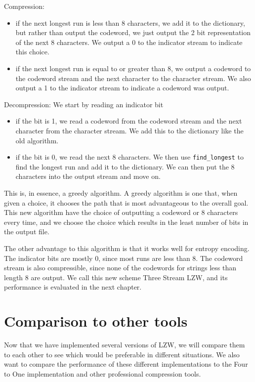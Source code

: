 \documentclass[12pt,twoside]{reedthesis}
\providecommand{\tightlist}{%
  \setlength{\itemsep}{0pt}\setlength{\parskip}{0pt}}
\begin{document}
Compression:
\begin{itemize}
\tightlist
\item
  if the next longest run is less than 8 characters, we add it to the dictionary, but rather than output the codeword, we just output the 2 bit representation of the next 8 characters. We output a 0 to the indicator stream to indicate this choice.
\item
  if the next longest run is equal to or greater than 8, we output a codeword to the codeword stream and the next character to the character stream. We also output a 1 to the indicator stream to indicate a codeword was output.
\end{itemize}
Decompression: We start by reading an indicator bit
\begin{itemize}
\tightlist
\item
  if the bit is 1, we read a codeword from the codeword stream and the next character from the character stream. We add this to the dictionary like the old algorithm.
\item
  if the bit is 0, we read the next 8 characters. We then use \texttt{find\_longest} to find the longest run and add it to the dictionary. We can then put the 8 characters into the output stream and move on.
\end{itemize}
This is, in essence, a greedy algorithm. A greedy algorithm is one that, when given a choice, it chooses the path that is most advantageous to the overall goal. This new algorithm have the choice of outputting a codeword or 8 characters every time, and we choose the choice which results in the least number of bits in the output file.

The other advantage to this algorithm is that it works well for entropy encoding. The indicator bits are mostly 0, since most runs are less than 8. The codeword stream is also compressible, since none of the codewords for strings less than length 8 are output. We call this new scheme Three Stream LZW, and its performance is evaluated in the next chapter.

\hypertarget{comparison-to-other-tools}{%
\chapter{Comparison to other tools}\label{comparison-to-other-tools}}

Now that we have implemented several versions of LZW, we will compare them to each other to see which would be preferable in different situations. We also want to compare the performance of these different implementations to the Four to One implementation and other professional compression tools.
\end{document}
